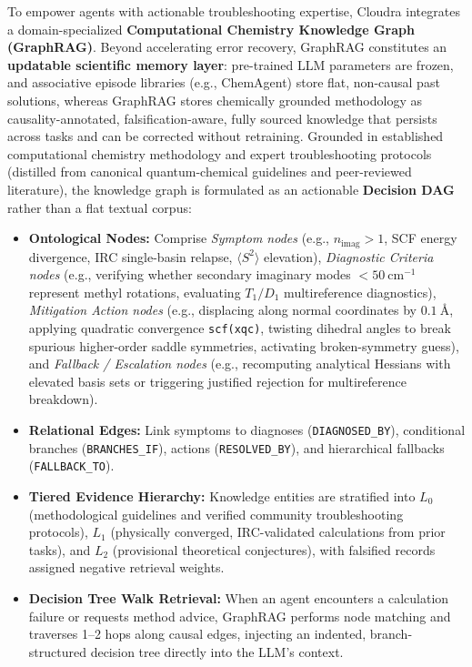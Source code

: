 \documentclass[10pt,twocolumn,letterpaper]{article}
\begin{document}
To empower agents with actionable troubleshooting expertise, Cloudra integrates a domain-specialized \textbf{Computational Chemistry Knowledge Graph (GraphRAG)}. Beyond accelerating error recovery, GraphRAG constitutes an \textbf{updatable scientific memory layer}: pre-trained LLM parameters are frozen, and associative episode libraries (e.g., ChemAgent) store flat, non-causal past solutions, whereas GraphRAG stores chemically grounded methodology as causality-annotated, falsification-aware, fully sourced knowledge that persists across tasks and can be corrected without retraining. Grounded in established computational chemistry methodology and expert troubleshooting protocols (distilled from canonical quantum-chemical guidelines and peer-reviewed literature), the knowledge graph is formulated as an actionable \textbf{Decision DAG} rather than a flat textual corpus:
\begin{itemize}[leftmargin=*]
\item \textbf{Ontological Nodes:} Comprise \textit{Symptom nodes} (e.g., $n_\mathrm{imag} > 1$, SCF energy divergence, IRC single-basin relapse, $\langle S^2 \rangle$ elevation), \textit{Diagnostic Criteria nodes} (e.g., verifying whether secondary imaginary modes $< 50\ \mathrm{cm^{-1}}$ represent methyl rotations, evaluating $T_1 / D_1$ multireference diagnostics), \textit{Mitigation Action nodes} (e.g., displacing along normal coordinates by $0.1\ \text{\AA}$, applying quadratic convergence \texttt{scf(xqc)}, twisting dihedral angles to break spurious higher-order saddle symmetries, activating broken-symmetry guess), and \textit{Fallback / Escalation nodes} (e.g., recomputing analytical Hessians with elevated basis sets or triggering justified rejection for multireference breakdown).
\item \textbf{Relational Edges:} Link symptoms to diagnoses (\texttt{DIAGNOSED\_BY}), conditional branches (\texttt{BRANCHES\_IF}), actions (\texttt{RESOLVED\_BY}), and hierarchical fallbacks (\texttt{FALLBACK\_TO}).
\item \textbf{Tiered Evidence Hierarchy:} Knowledge entities are stratified into $L_0$ (methodological guidelines and verified community troubleshooting protocols), $L_1$ (physically converged, IRC-validated calculations from prior tasks), and $L_2$ (provisional theoretical conjectures), with falsified records assigned negative retrieval weights.
\item \textbf{Decision Tree Walk Retrieval:} When an agent encounters a calculation failure or requests method advice, GraphRAG performs node matching and traverses 1--2 hops along causal edges, injecting an indented, branch-structured decision tree directly into the LLM's context.
\end{itemize}
\end{document}

